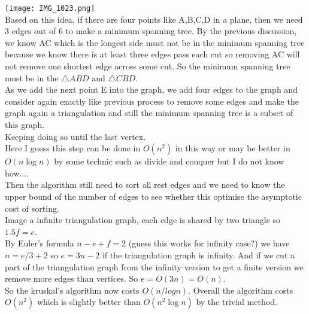 \documentclass[10pt,twoside,a4paper]{article}
\begin{document}
\begin{itemize}
\begin{itemize}
\texttt{[image: IMG\_1023.png]}
\\Based on this idea, if there are four points like A,B,C,D in a plane, then we need 3 edges out of 6 to make a minimum spanning tree. By the previous discussion, we know AC which is the longest side must not be in the minimum spanning tree because we know there is at least three edges pass each cut so removing AC will not remove one shortest edge across some cut. So the minimum spanning tree must be in the $\triangle ABD$ and $\triangle CBD$.
\\As we add the next point E into the graph, we add four edges to the graph and consider again exactly like previous process to remove some edges and make the graph again a triangulation and still the minimum spanning tree is a subset of this graph.
\\Keeping doing so until the last vertex.
\\Here I guess this step can be done in $O(n^2)$ in this way or may be better in $O(n\log n)$ by some technic such as divide and conquer but I do not know how....
\\Then the algorithm still need to sort all rest edges and we need to know the upper bound of the number of edges to see whether this optimise the asymptotic cost of sorting.
\\Image a infinite triangulation graph, each edge is shared by two triangle so $1.5f=e$.
\\By Euler’s formula $n-e+f=2$ (guess this works for infinity case?) we have $n=e/3+2$ so $e=3n-2$ if the triangulation graph is infinity. And if we cut a part of the triangulation graph from the infinity version to get a finite version we remove more edges than vertices. So $e=O(3n)=O(n)$.
\\So the kruskal's algorithm now costs $O(n/log n)$. Overall the algorithm costs $O(n^2)$ which is slightly better than $O(n^2\log n)$ by the trivial method.
\end{itemize}
\end{itemize}
\end{document}
